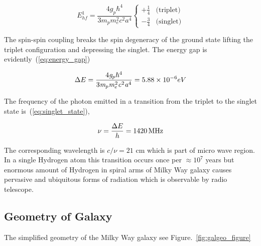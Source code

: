 \documentclass[fleqn,usenatbib]{mnras}
\begin{document}
\begin{equation}
\label{eq:total_spin}
 \mathit{E}_{hf}^{1}=\frac{4\mathit{g}_{p}\mathit{\hbar}^{4}}{3\mathit{m}_{p}\mathit{m}_{e}^{2}\mathit{c}^{2}\mathit{a}^{4}}\begin{cases}
 +\frac{1}{4}& \text{(triplet)}\\
 -\frac{3}{4}& \text{(singlet)}
\end{cases} 
\end{equation}

The spin-spin coupling breaks the spin degeneracy of the ground state lifting the triplet configuration and depressing the singlet. The energy gap is evidently~(\ref{eq:energy_gap})

\begin{equation}
 \Delta\-E=\frac{4\mathit{g}_{p}\mathit{\hbar}^{4}}{3\mathit{m}_{p}\mathit{m}_{e}^{2}\mathit{c}^{2}\mathit{a}^{4}}=5.88\times10^{-6} eV
 \label{eq:energy_gap}
\end{equation}


The frequency of the photon emitted in a transition from the triplet to the singlet state is~(\ref{eq:singlet_state}),

\begin{equation}
 \mathit{\nu}=\frac{\Delta\-E}{h}=\SI{1420}{MHz}
 \label{eq:singlet_state}
\end{equation}

The corresponding wavelength is $c/\nu=21$ cm which is part of micro wave region. In a single Hydrogen atom this transition occurs once per $\approx10^{7}$ years but enormous amount of Hydrogen in spiral arms of Milky Way galaxy causes pervasive and ubiquitous forms of radiation which is observable by radio telescope.

\subsection{Geometry of Galaxy}

The simplified geometry of the Milky Way galaxy\citep{CathyHorellou2015} see Figure.~\ref{fig:galgeo_figure}
\end{document}
